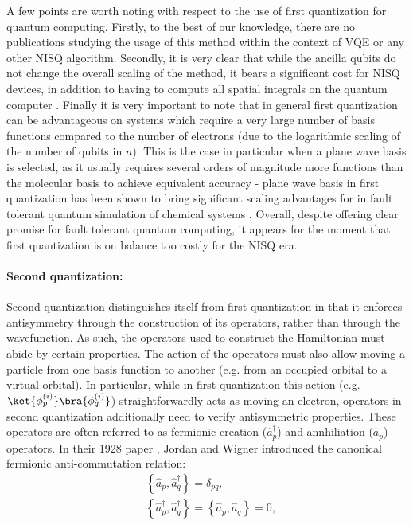 A few points are worth noting with respect to the use of first quantization for quantum computing. Firstly, to the best of our knowledge, there are no publications studying the usage of this method within the context of VQE or any other NISQ algorithm. Secondly, it is very clear that while the ancilla qubits do not change the overall scaling of the method, it bears a significant cost for NISQ devices, in addition to having to compute all spatial integrals on the quantum computer \cite{Moll2018}. Finally it is very important to note that in general first quantization can be advantageous on systems which require a very large number of basis functions compared to the number of electrons (due to the logarithmic scaling of the number of qubits in $n$). This is the case in particular when a plane wave basis is selected, as it usually requires several orders of magnitude more functions than the molecular basis to achieve equivalent accuracy \cite{Babbush2018} - plane wave basis in first quantization has been shown to bring significant scaling advantages for in fault tolerant quantum simulation of chemical systems \cite{Babbush2019}. Overall, despite offering clear promise for fault tolerant quantum computing, it appears for the moment that first quantization is on balance too costly for the NISQ era.

\paragraph{Second quantization: } \label{sec:second_quantization}

Second quantization distinguishes itself from first quantization in that it enforces antisymmetry through the construction of its operators, rather than through the wavefunction. As such, the operators used to construct the Hamiltonian must abide by certain properties. %
The action of the operators must also allow moving a particle from one basis function to another (e.g. from an occupied orbital to a virtual orbital). In particular, while in first quantization this action (e.g. $\ket{\phi_p^{(i)}} \bra{\phi_q^{(i)}}$) straightforwardly acts as moving an electron, operators in second quantization additionally need to verify antisymmetric properties. These operators are often referred to as fermionic creation ($\hat{a}^{\dagger}_p$) and annhiliation ($\hat{a}_p$) operators.  In their 1928 paper \cite{Jordan1928}, Jordan and Wigner introduced the canonical fermionic anti-commutation relation:
\begin{equation} \label{eq:anticommutation}
\begin{aligned}
&\left\{\hat{a}_p, \hat{a}_q^{\dagger}\right\}= \delta_{pq}, \\
&\left\{\hat{a}_p^{\dagger}, \hat{a}_q^{\dagger}\right\} = \left\{\hat{a}_p, \hat{a}_q\right\} = 0, 
\end{aligned}
\end{equation}

